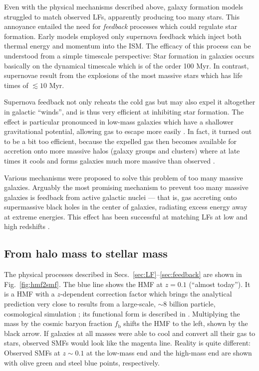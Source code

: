 \documentclass[useAMS,usenatbib,bibyear]{aa}
\begin{document}
Even with the physical mechanisms described above, galaxy formation models struggled to match observed LFs, apparently producing too many stars.
This annoyance entailed the need for \emph{feedback} processes which could regulate star formation.
Early models \citep[e.g.][]{White1991,Somerville1999,Efstathiou2000} employed only supernova feedback which inject both thermal energy and momentum into the ISM. 
The efficacy of this process can be understood from a simple timescale perspective:
Star formation in galaxies occurs basically on the dynamical timescale which is of the order 100 Myr. In contrast, supernovae result from the explosions of the most massive stars which has life times of $\lesssim 10$ Myr.

Supernova feedback not only reheats the cold gas but may also expel it altogether in galactic ``winds'', and is thus very efficient at inhibiting star formation. The effect is particular pronounced in low-mass galaxies which have a shallower gravitational potential, allowing gas to escape more easily \citep{Dekel1986,Kauffmann1993,Natarajan1999}.
In fact, it turned out to be a bit too efficient, because the expelled gas then becomes available for accretion onto more massive halos (galaxy groups and clusters) where at late times it cools and forms galaxies much more massive than observed \citep{Benson2003}.

Various mechanisms were proposed to solve this problem of too many massive galaxies.
Arguably the most promising mechanism to prevent too many massive galaxies is feedback from active galactic nuclei --- that is, gas accreting onto supermassive black holes in the center of galaxies, radiating excess energy away at extreme energies.
This effect has been successful at matching LFs at low and high redshifts \citep[e.g.][]{Croton2006,Bower2006,Somerville2008,Mccarthy2011}.

\subsection{From halo mass to stellar mass}
\label{sec:hmf2smf}

The physical processes described in Secs.~\ref{sec:LF}--\ref{sec:feedback} are shown in Fig.~\ref{fig:hmf2smf}.
The blue line shows the HMF at $z=0.1$ (``almost today'').
It is a \citet{Sheth2002} HMF with a $z$-dependent correction factor which brings the analytical prediction very close to results from a large-scale, $\sim8$ billion particle, cosmological simulation \citep{Klypin2011};
its functional form is described in \citet{Laursen2019}.
Multiplying the mass by the cosmic baryon fraction $f_\mathrm{b}$ shifts the HMF to the left, shown by the black arrow.
If galaxies at all masses were able to cool and convert all their gas to stars, observed SMFs would look like the magenta line.
Reality is quite different: Observed SMFs at $z\sim0.1$ at the low-mass end \citep{Wright2017} and the high-mass end \citep{Bernardi2013} are shown with olive green and steel blue points, respectively.
\end{document}
